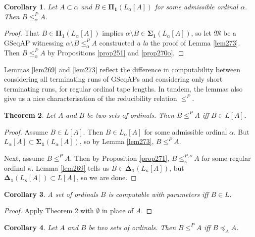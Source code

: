 \documentclass[12pt, twoside]{memoir}
\numberwithin{equation}{section}
\newtheorem{thm}{Theorem}[section]
\newtheorem{cor}[thm]{Corollary}
\theoremstyle{definition}
\theoremstyle{remark}
\theoremstyle{definition}
\theoremstyle{definition}
\theoremstyle{definition}
\theoremstyle{remark}
\begin{document}
\begin{cor}
Let $A \subset \alpha$ and $B \in \mathbf{\Pi_1}(L_{\alpha}[A])$ for some admissible ordinal $\alpha$. Then $B \leq^P_{\alpha} A$.
\end{cor}

\begin{proof}
That $B \in \mathbf{\Pi_1}(L_{\alpha}[A])$ implies $\alpha \setminus B \in \mathbf{\Sigma_1}(L_{\alpha}[A])$, so let $\mathfrak{M}$ be a GSeqAP witnessing $\alpha \setminus B \leq^P_{\alpha} A$ constructed \textit{a la} the proof of Lemma \ref{lem273}. Then $B \leq^P_{\alpha} A$ by Propositions \ref{prop251} and \ref{prop270o}.
\end{proof}

Lemmas \ref{lem269} and \ref{lem273} reflect the difference in computability between considering all terminating runs of GSeqAPs and considering only short terminating runs, for regular ordinal tape lengths. In tandem, the lemmas also give us a nice characterisation of the reducibility relation $\leq^P$.

\begin{thm}\label{thm275}
Let $A$ and $B$ be two sets of ordinals. Then $B \leq^P A$ iff $B \in L[A]$.
\end{thm}

\begin{proof}
Assume $B \in L[A]$. Then $B \in L_{\alpha}[A]$ for some admissible ordinal $\alpha$. But $L_{\alpha}[A] \subset \mathbf{\Sigma_1}(L_{\alpha}[A])$, so by Lemma \ref{lem273}, $B \leq^P A$. 

Next, assume $B \leq^P A$. Then by Proposition \ref{prop271}, $B \leq^{P, s}_{\kappa} A$ for some regular ordinal $\kappa$. Lemma \ref{lem269} tells us $B \in \mathbf{\Delta_1}(L_{\kappa}[A])$, but $\mathbf{\Delta_1}(L_{\kappa}[A]) \subset L[A]$, so we are done.
\end{proof}

\begin{cor}
A set of ordinals $B$ is computable with parameters iff $B \in L$.
\end{cor}

\begin{proof}
Apply Theorem \ref{thm275} with $\emptyset$ in place of $A$. 
\end{proof}

\begin{cor}\label{cor8343}
Let $A$ and $B$ be two sets of ordinals. Then $B \leq^P A$ iff $B \preceq_A A$.
\end{cor}
\end{document}
